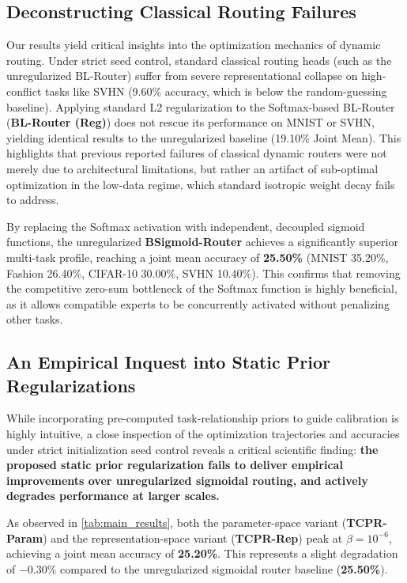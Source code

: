 \subsection{Deconstructing Classical Routing Failures}
Our results yield critical insights into the optimization mechanics of dynamic routing. Under strict seed control, standard classical routing heads (such as the unregularized BL-Router) suffer from severe representational collapse on high-conflict tasks like SVHN (9.60\% accuracy, which is below the random-guessing baseline). Applying standard L2 regularization to the Softmax-based BL-Router (\textbf{BL-Router (Reg)}) does not rescue its performance on MNIST or SVHN, yielding identical results to the unregularized baseline (19.10\% Joint Mean). This highlights that previous reported failures of classical dynamic routers were not merely due to architectural limitations, but rather an artifact of sub-optimal optimization in the low-data regime, which standard isotropic weight decay fails to address.

By replacing the Softmax activation with independent, decoupled sigmoid functions, the unregularized \textbf{BSigmoid-Router} achieves a significantly superior multi-task profile, reaching a joint mean accuracy of \textbf{25.50\%} (MNIST 35.20\%, Fashion 26.40\%, CIFAR-10 30.00\%, SVHN 10.40\%). This confirms that removing the competitive zero-sum bottleneck of the Softmax function is highly beneficial, as it allows compatible experts to be concurrently activated without penalizing other tasks.

\subsection{An Empirical Inquest into Static Prior Regularizations}
While incorporating pre-computed task-relationship priors to guide calibration is highly intuitive, a close inspection of the optimization trajectories and accuracies under strict initialization seed control reveals a critical scientific finding: \textbf{the proposed static prior regularization fails to deliver empirical improvements over unregularized sigmoidal routing, and actively degrades performance at larger scales.}

As observed in \cref{tab:main_results}, both the parameter-space variant (\textbf{TCPR-Param}) and the representation-space variant (\textbf{TCPR-Rep}) peak at $\beta = 10^{-6}$, achieving a joint mean accuracy of \textbf{25.20\%}. This represents a slight degradation of $-0.30\%$ compared to the unregularized sigmoidal router baseline (\textbf{25.50\%}). 

